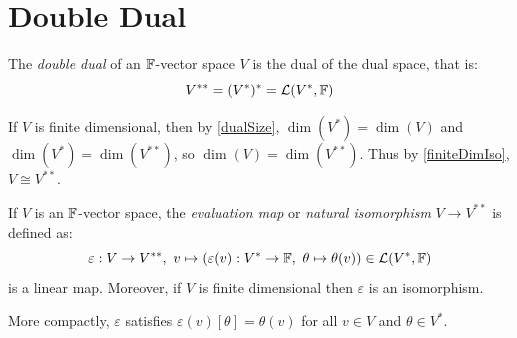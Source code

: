 \documentclass[../main.tex]{subfiles}
\begin{document}
\section{Double Dual}
\begin{definition}
  The \textit{double dual} of an $\mathbb{F}$-vector space $V$ is the dual of the dual space, that is:
  \[
    V^{**} = (V^{*})^{*} = \mathcal{L}(V^{*}, \mathbb{F})
  \]
\end{definition}
\begin{remark}
  If $V$ is finite dimensional, then by \cref{dualSize}, $\dim(V^{*}) = \dim(V)$ and $\dim(V^{*}) = \dim(V^{**})$, so $\dim(V) = \dim(V^{**})$.
  Thus by \cref{finiteDimIso}, $V \cong V^{**}$.
\end{remark}
\begin{theorem}
  If $V$ is an $\mathbb{F}$-vector space, the \textit{evaluation map} or \textit{natural isomorphism} $V \to V^{**}$ is defined as: \label{evalMap}
  \[
    \varepsilon: V \to V^{**},\ v \mapsto (\varepsilon(v): V^{*} \to \mathbb{F},\ \theta \mapsto \theta(v)) \in \mathcal{L}(V^{*}, \mathbb{F})
  \]
  is a linear map.
  Moreover, if $V$ is finite dimensional then $\varepsilon$ is an isomorphism.
\end{theorem}
\begin{remark}
  More compactly, $\varepsilon$ satisfies $\varepsilon(v)[\theta] = \theta(v)$ for all $v \in V$ and $\theta \in V^{*}$.
\end{remark}
\end{document}

